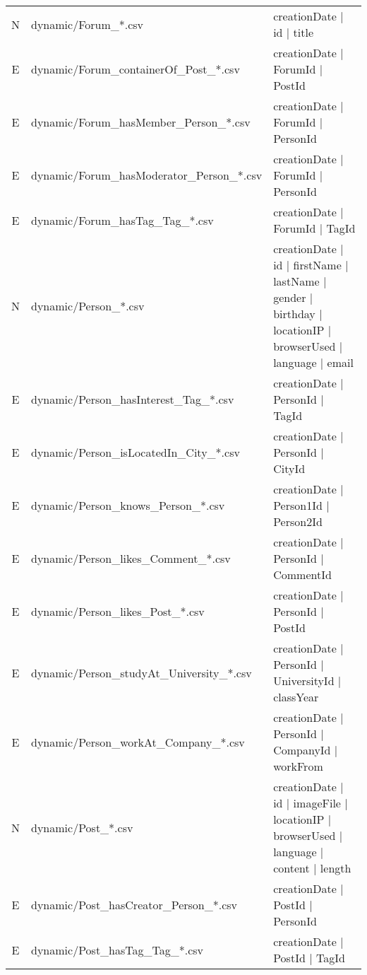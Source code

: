 \begin{table}[htb]
\begin{tabularx}{\linewidth}{|c|l|X|}
        \hline
        N                    & dynamic/Forum\_*.csv                            & creationDate | id | title \\
        E                    & dynamic/Forum\_containerOf\_Post\_*.csv         & creationDate | ForumId | PostId \\
        E                    & dynamic/Forum\_hasMember\_Person\_*.csv         & creationDate | ForumId | PersonId \\
        E                    & dynamic/Forum\_hasModerator\_Person\_*.csv      & creationDate | ForumId | PersonId \\
        E                    & dynamic/Forum\_hasTag\_Tag\_*.csv               & creationDate | ForumId | TagId \\
        \hline
        N                    & dynamic/Person\_*.csv                           & creationDate | id | firstName | lastName | gender | birthday | locationIP | browserUsed | language | email \\
        E                    & dynamic/Person\_hasInterest\_Tag\_*.csv         & creationDate | PersonId | TagId \\
        E                    & dynamic/Person\_isLocatedIn\_City\_*.csv        & creationDate | PersonId | CityId \\
        E                    & dynamic/Person\_knows\_Person\_*.csv            & creationDate | Person1Id | Person2Id \\
        E                    & dynamic/Person\_likes\_Comment\_*.csv           & creationDate | PersonId | CommentId \\
        E                    & dynamic/Person\_likes\_Post\_*.csv              & creationDate | PersonId | PostId \\
        E                    & dynamic/Person\_studyAt\_University\_*.csv      & creationDate | PersonId | UniversityId | classYear \\
        E                    & dynamic/Person\_workAt\_Company\_*.csv          & creationDate | PersonId | CompanyId | workFrom \\
        \hline
        N                    & dynamic/Post\_*.csv                             & creationDate | id | imageFile | locationIP | browserUsed | language | content | length \\
        E                    & dynamic/Post\_hasCreator\_Person\_*.csv         & creationDate | PostId | PersonId \\
        E                    & dynamic/Post\_hasTag\_Tag\_*.csv                & creationDate | PostId | TagId \\

\end{tabularx}
\end{table}
